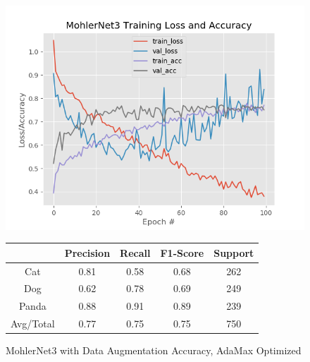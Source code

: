\documentclass[12pt]{article}
\begin{document}
\begin{center}
	 \\
\end{center}


\begin{figure}[h]
	\centering %
	\captionsetup{justification=centering}
	\begin{minipage}{0.5\textwidth}
		\centering %
		\includegraphics[width=1\textwidth]{MohlerNet3_opt-AdamaxAugmented_KEEP.png}
		\caption{MohlerNet3 with Data Augmentation Accuracy, AdaMax Optimized} \label{MN3Aug}
	\end{minipage}\hfill
	\begin{minipage}{0.5\textwidth}
		\begin{center}
			\begin{tabular}[5pt]{| c| c| c| c|c|}
				\hline
				& Precision & Recall & F1-Score & Support \\[0.5ex] 
				\hline 	
				Cat   &    0.81&      0.58 &     0.68  &     262\\ \hline 
				Dog    &   0.62 &     0.78 &     0.69 &      249    \\ \hline 
				Panda   &   0.88&      0.91  &    0.89  &     239   \\ \hline 
				Avg/Total  &    0.77 &     0.75   &   0.75   &    750\\ \hline 
				
			\end{tabular}
			\label{MN3RAug}
		\end{center}	
	\end{minipage}
\end{figure}
\end{document}
